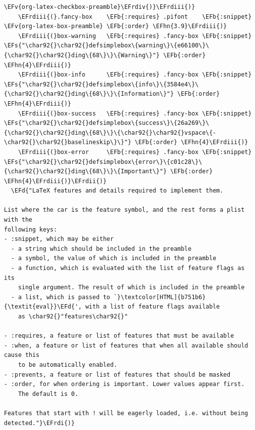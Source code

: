 \documentclass{scrartcl}
\newcommand{\EFd}[1]{\textcolor{EFd}{\textit{#1}}} %
\newcommand{\EFs}[1]{\textcolor{EFs}{#1}} %
\newcommand{\EFb}[1]{\textcolor{EFb}{#1}} %
\newcommand{\EFv}[1]{\textcolor{EFv}{#1}} %
\newcommand{\EFhn}[1]{\textcolor{EFhn}{\textbf{#1}}} %
\newcommand{\EFrdi}[1]{\textcolor{EFrdi}{#1}} %
\newcommand{\EFrdii}[1]{\textcolor{EFrdii}{#1}} %
\newcommand{\EFrdiii}[1]{\textcolor{EFrdiii}{#1}} %
\newcommand{\EFrdiv}[1]{\textcolor{EFrdiv}{#1}} %
\begin{document}
\begin{Code}
\begin{Verbatim}[]
                                    \EFv{org-latex-checkbox-preamble}\EFrdiv{)}\EFrdiii{)}
    \EFrdiii{(}.fancy-box    \EFb{:requires} .pifont    \EFb{:snippet} \EFv{org-latex-box-preamble} \EFb{:order} \EFhn{3.9}\EFrdiii{)}
    \EFrdiii{(}box-warning   \EFb{:requires} .fancy-box \EFb{:snippet} \EFs{"\char92{}\char92{}defsimplebox\{warning\}\{e66100\}\{\char92{}\char92{}ding\{68\}\}\{Warning\}"} \EFb{:order} \EFhn{4}\EFrdiii{)}
    \EFrdiii{(}box-info      \EFb{:requires} .fancy-box \EFb{:snippet} \EFs{"\char92{}\char92{}defsimplebox\{info\}\{3584e4\}\{\char92{}\char92{}ding\{68\}\}\{Information\}"} \EFb{:order} \EFhn{4}\EFrdiii{)}
    \EFrdiii{(}box-success   \EFb{:requires} .fancy-box \EFb{:snippet} \EFs{"\char92{}\char92{}defsimplebox\{success\}\{26a269\}\{\char92{}\char92{}ding\{68\}\}\{\char92{}\char92{}vspace\{-\char92{}\char92{}baselineskip\}\}"} \EFb{:order} \EFhn{4}\EFrdiii{)}
    \EFrdiii{(}box-error     \EFb{:requires} .fancy-box \EFb{:snippet} \EFs{"\char92{}\char92{}defsimplebox\{error\}\{c01c28\}\{\char92{}\char92{}ding\{68\}\}\{Important\}"} \EFb{:order} \EFhn{4}\EFrdiii{)}\EFrdii{)}
  \EFd{"LaTeX features and details required to implement them.

List where the car is the feature symbol, and the rest forms a plist with the
following keys:
- :snippet, which may be either
  - a string which should be included in the preamble
  - a symbol, the value of which is included in the preamble
  - a function, which is evaluated with the list of feature flags as its
    single argument. The result of which is included in the preamble
  - a list, which is passed to `}\textcolor[HTML]{b751b6}{\textit{eval}}\EFd{', with a list of feature flags available
    as \char92{}"features\char92{}"

- :requires, a feature or list of features that must be available
- :when, a feature or list of features that when all available should cause this
    to be automatically enabled.
- :prevents, a feature or list of features that should be masked
- :order, for when ordering is important. Lower values appear first.
    The default is 0.

Features that start with ! will be eagerly loaded, i.e. without being detected."}\EFrdi{)}
\end{Verbatim}
\end{Code}
\end{document}

